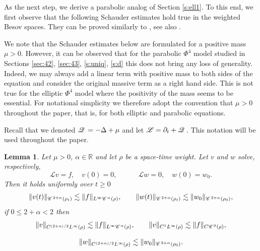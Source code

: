\documentclass[a4paper,11pt]{article}
\renewcommand{\geq}{\geqslant}
\newtheorem{lemma}[theorem]{Lemma}
\numberwithin{equation}{section}
\newcommand{\CC}{\mathscr{C} \hspace{.1em}}
\newcommand{\LL}{\mathscr{L}}
\newcommand{\Q}{\mathscr{Q} \hspace{.2em}}
\newcommand{\R}{\mathbb{R}}
\newcommand{\8}{\infty}
\begin{document}
As the next step, we derive a parabolic analog of Section \ref{s:ell1}.
To this end,  we first observe that the following Schauder estimates hold true in the weighted Besov spaces. They can be proved similarly to  \cite[Lemma A.9]{GIP}, see also \cite[Section 3.2]{MW17}.

\begin{remark}\label{rem:mu}
We note that the Schauder estimates below are formulated for a positive mass $\mu>0$. However, it can be observed that for the parabolic $\Phi^{4}$ model studied in Sections \ref{sec:42}, \ref{sec:43}, \ref{s:uniq}, \ref{s:d} this does not bring any loss of generality. Indeed, we may always add a linear term with positive mass to both sides of the equation and consider the original massive term as a right hand side. This is not true for the elliptic $\Phi^{4}$ model where the positivity of the mass seems to be essential. For notational simplicity we therefore adopt the convention that $\mu>0$ throughout the paper, that is,  for both elliptic and parabolic equations.
\end{remark}

Recall that we denoted $\Q=-\Delta+\mu$ and let $\LL=\partial_{t}+\Q$. This notation will be used throughout the paper.

\begin{lemma}\label{lemma:sch}
Let $\mu>0$, $\alpha\in\R$ and let $\rho$ be a  space-time weight. Let $v$ and $w$ solve, respectively,
$$
\LL v=f,\quad v(0)=0,\quad\qquad \LL  w=0,\quad w(0)=w_{0}.
$$ 
Then  it holds uniformly over $t\geq 0$
\begin{equation}\label{eq:1vw}
\|v(t)\|_{\CC^{2+\alpha}(\rho_{t})}\lesssim \|f\|_{L^{\infty}\CC^{\alpha}(\rho)},\qquad
\|w(t)\|_{\CC^{2+\alpha}(\rho_{t})}\lesssim \|w_{0}\|_{\CC^{2+\alpha}(\rho_{0})},
\end{equation}
if $0\leqslant 2+\alpha < 2$ then
$$
\|v\|_{C^{(2+\alpha)/{2}}L^{\infty}(\rho)}\lesssim \|f\|_{L^{\infty}\CC^{\alpha}(\rho)},\qquad\|v\|_{C^{1}L^{\infty}(\rho)}\lesssim \|f\|_{C\CC^{0}(\rho)},
$$

$$
 \|w\|_{C^{(2+\alpha)/2}L^{\infty}(\rho)}\lesssim \|w_{0}\|_{\CC^{2+\alpha}(\rho_{0})}.
$$
\end{lemma}
\end{document}
